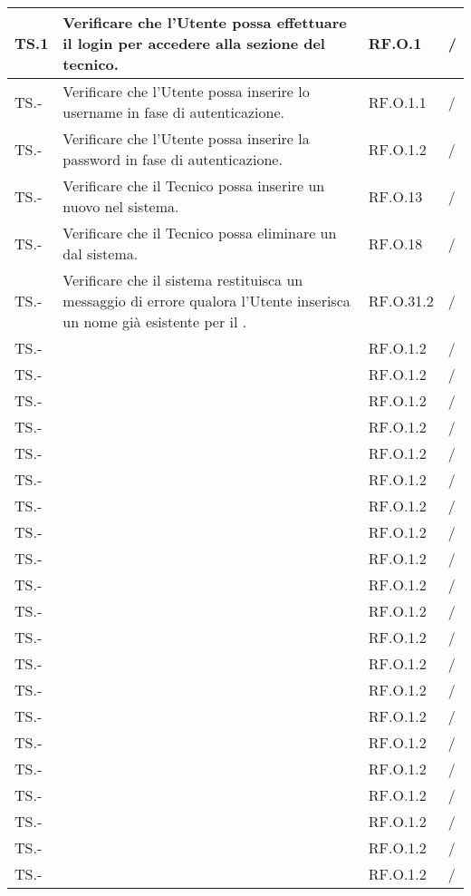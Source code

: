 \begin{adjustwidth}{-0.5cm}{-0.5cm}
\begin{longtable}{|P{1.5cm}|P{7cm}|P{2.5cm}|>{\arraybackslash}P{1.5cm}|}
		TS.1 & Verificare che l'Utente possa effettuare il login per accedere alla sezione del tecnico. & RF.O.1 & / \\ 
    \hline TS.- & Verificare che l'Utente possa inserire lo username in fase di autenticazione. & RF.O.1.1 & / \\ 
    \hline TS.- & Verificare che l'Utente possa inserire la password in fase di autenticazione. & RF.O.1.2 & / \\
		\hline TS.- & Verificare che il Tecnico possa inserire un nuovo  nel sistema. & RF.O.13 & / \\ 
		\hline TS.- & Verificare che il Tecnico possa eliminare un  dal sistema. & RF.O.18 & / \\ 
		\hline TS.- & Verificare che il sistema restituisca un messaggio di errore qualora l'Utente inserisca un nome già esistente per il . & RF.O.31.2 & / \\ 
		\hline TS.- & & RF.O.1.2 & / \\ 
		\hline TS.- & & RF.O.1.2 & / \\ 
		\hline TS.- & & RF.O.1.2 & / \\ 
		\hline TS.- & & RF.O.1.2 & / \\ 
		\hline TS.- & & RF.O.1.2 & / \\ 
		\hline TS.- & & RF.O.1.2 & / \\ 
		\hline TS.- & & RF.O.1.2 & / \\ 
		\hline TS.- & & RF.O.1.2 & / \\ 
		\hline TS.- & & RF.O.1.2 & / \\ 
		\hline TS.- & & RF.O.1.2 & / \\ 
		\hline TS.- & & RF.O.1.2 & / \\ 
		\hline TS.- & & RF.O.1.2 & / \\ 
		\hline TS.- & & RF.O.1.2 & / \\ 
		\hline TS.- & & RF.O.1.2 & / \\ 
		\hline TS.- & & RF.O.1.2 & / \\ 
		\hline TS.- & & RF.O.1.2 & / \\ 
		\hline TS.- & & RF.O.1.2 & / \\ 
		\hline TS.- & & RF.O.1.2 & / \\ 
		\hline TS.- & & RF.O.1.2 & / \\ 
		\hline TS.- & & RF.O.1.2 & / \\ 
		\hline TS.- & & RF.O.1.2 & / \\ 
	\end{longtable}
\end{adjustwidth}
\egroup
